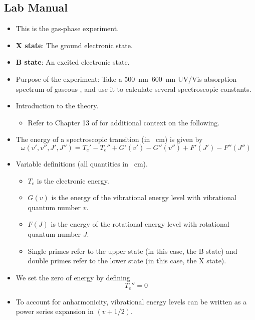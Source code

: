 \documentclass[../notes.tex]{subfiles}
\begin{document}
\subsection*{Lab Manual}
\begin{itemize}
    \item This is the gas-phase experiment.
    \item \textbf{X state}: The ground electronic state.
    \item \textbf{B state}: An excited electronic state.
    \item Purpose of the experiment: Take a \SIrange{500}{600}{\nano\meter} UV/Vis absorption spectrum of gaseous , and use it to calculate several spectroscopic constants.
    \item Introduction to the theory.
    \begin{itemize}
        \item Refer to Chapter 13 of \textcite{bib:McQuarrieSimon} for additional context on the following.
    \end{itemize}
    \item The energy of a spectroscopic transition (in \si{\per\centi\meter}) is given by
    \begin{equation*}
        \omega(v',v'',J',J'') = T_e'-T_e''+G'(v')-G''(v'')+F'(J')-F''(J'')
    \end{equation*}
    \item Variable definitions (all quantities in \si{\per\centi\meter}).
    \begin{itemize}
        \item $T_e$ is the electronic energy.
        \item $G(v)$ is the energy of the vibrational energy level with vibrational quantum number $v$.
        \item $F(J)$ is the energy of the rotational energy level with rotational quantum number $J$.
        \item Single primes refer to the upper state (in this case, the B state) and double primes refer to the lower state (in this case, the X state).
    \end{itemize}
    \item We set the zero of energy by defining
    \begin{equation*}
        T_e'' = 0
    \end{equation*}
    \item To account for anharmonicity, vibrational energy levels can be written as a power series expansion in $(v+1/2)$.
    \begin{equation*}

\end{equation*}
\end{itemize}
\end{document}
